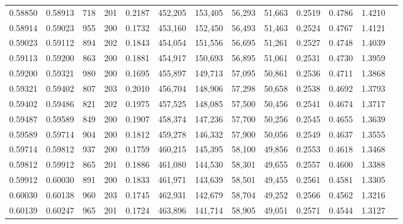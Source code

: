 \begin{tabular}{rrrrrrrrrrrrr}
0.58850 & 0.58913 &   718 & 201 &                                     0.2187 & 452,205 & 153,405 &  56,293 &  51,663 & 0.2519 & 0.4786 & 1.4210 \\
0.58914 & 0.59023 &   955 & 200 &                                     0.1732 & 453,160 & 152,450 &  56,493 &  51,463 & 0.2524 & 0.4767 & 1.4121 \\
0.59023 & 0.59112 &   894 & 202 &                                     0.1843 & 454,054 & 151,556 &  56,695 &  51,261 & 0.2527 & 0.4748 & 1.4039 \\
0.59113 & 0.59200 &   863 & 200 &                                     0.1881 & 454,917 & 150,693 &  56,895 &  51,061 & 0.2531 & 0.4730 & 1.3959 \\
0.59200 & 0.59321 &   980 & 200 &                                     0.1695 & 455,897 & 149,713 &  57,095 &  50,861 & 0.2536 & 0.4711 & 1.3868 \\
0.59321 & 0.59402 &   807 & 203 &                                     0.2010 & 456,704 & 148,906 &  57,298 &  50,658 & 0.2538 & 0.4692 & 1.3793 \\
0.59402 & 0.59486 &   821 & 202 &                                     0.1975 & 457,525 & 148,085 &  57,500 &  50,456 & 0.2541 & 0.4674 & 1.3717 \\
0.59487 & 0.59589 &   849 & 200 &                                     0.1907 & 458,374 & 147,236 &  57,700 &  50,256 & 0.2545 & 0.4655 & 1.3639 \\
0.59589 & 0.59714 &   904 & 200 &                                     0.1812 & 459,278 & 146,332 &  57,900 &  50,056 & 0.2549 & 0.4637 & 1.3555 \\
0.59714 & 0.59812 &   937 & 200 &                                     0.1759 & 460,215 & 145,395 &  58,100 &  49,856 & 0.2553 & 0.4618 & 1.3468 \\
0.59812 & 0.59912 &   865 & 201 &                                     0.1886 & 461,080 & 144,530 &  58,301 &  49,655 & 0.2557 & 0.4600 & 1.3388 \\
0.59912 & 0.60030 &   891 & 200 &                                     0.1833 & 461,971 & 143,639 &  58,501 &  49,455 & 0.2561 & 0.4581 & 1.3305 \\
0.60030 & 0.60138 &   960 & 203 &                                     0.1745 & 462,931 & 142,679 &  58,704 &  49,252 & 0.2566 & 0.4562 & 1.3216 \\
0.60139 & 0.60247 &   965 & 201 &                                     0.1724 & 463,896 & 141,714 &  58,905 &  49,051 & 0.2571 & 0.4544 & 1.3127 \\

\end{tabular}
